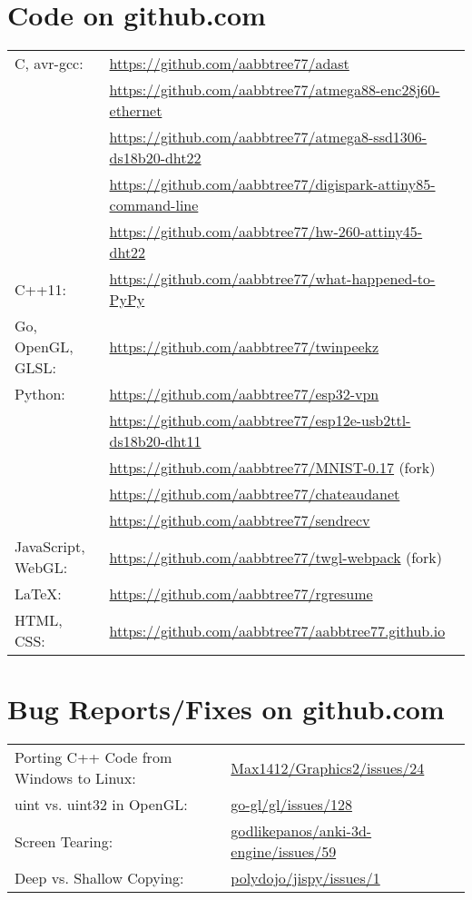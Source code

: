 \documentclass[a4paper,11pt]{article}
\begin{document}
\section{Code on github.com}
\begin{tabular}{ll}
C, avr-gcc: & \url{https://github.com/aabbtree77/adast}\\
& \url{https://github.com/aabbtree77/atmega88-enc28j60-ethernet}\\
& \url{https://github.com/aabbtree77/atmega8-ssd1306-ds18b20-dht22}\\
& \url{https://github.com/aabbtree77/digispark-attiny85-command-line}\\
& \url{https://github.com/aabbtree77/hw-260-attiny45-dht22}\\
C++11: & \url{https://github.com/aabbtree77/what-happened-to-PyPy}\\
Go, OpenGL, GLSL: & \url{https://github.com/aabbtree77/twinpeekz}\\
Python: & \url{https://github.com/aabbtree77/esp32-vpn}\\
& \url{https://github.com/aabbtree77/esp12e-usb2ttl-ds18b20-dht11}\\
& \url{https://github.com/aabbtree77/MNIST-0.17} (fork)\\
& \url{https://github.com/aabbtree77/chateaudanet}\\
& \url{https://github.com/aabbtree77/sendrecv}\\
JavaScript, WebGL: & \url{https://github.com/aabbtree77/twgl-webpack} (fork)\\
LaTeX: & \url{https://github.com/aabbtree77/rgresume}\\
HTML, CSS: & \url{https://github.com/aabbtree77/aabbtree77.github.io}
\end{tabular}
%
\section{Bug Reports/Fixes on github.com}
\begin{tabular}{ll}
Porting C++ Code from Windows to Linux: & \url{Max1412/Graphics2/issues/24}\\
uint vs. uint32 in OpenGL: & \url{go-gl/gl/issues/128}\\
Screen Tearing: & \url{godlikepanos/anki-3d-engine/issues/59}\\
Deep vs. Shallow Copying: & \url{polydojo/jispy/issues/1}
\end{tabular}
%
\end{document}
